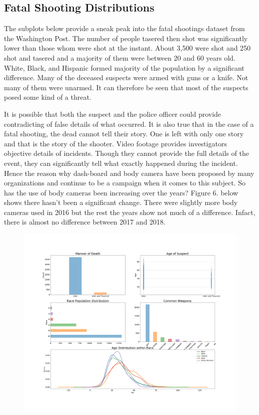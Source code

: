 \documentclass[a4paper,12pt]{article}
\begin{document}
\subsection{Fatal Shooting Distributions}
The subplots below provide a sneak peak into the fatal shootings dataset from the Washington Post. The number of people tasered then shot was significantly lower than those whom were shot at the instant. About 3,500 were shot and 250 shot and tasered and a majority of them were between 20 and 60 years old. White, Black, and Hispanic formed majority of the population by a significant difference. Many of the deceased suspects were armed with guns or a knife. Not many of them were unarmed. It can therefore be seen that most of the suspects posed some kind of a threat. 

It is possible that both the suspect and the police officer could provide contradicting of false details of what occurred. It is also true that in the case of a fatal shooting, the dead cannot tell their story. One is left with only one story and that is the story of the shooter. Video footage provides investigators objective details of incidents\cite{camera}. Though they cannot provide the full details of the event, they can significantly tell what exactly happened during the incident. Hence the reason why dash-board and body camera have been proposed by many organizations and continue to be a campaign when it comes to this subject. So has the use of body cameras been increasing over the years? Figure 6. below shows there hasn't been a significant change. There were slightly more body cameras used in 2016 but the rest the years show not much of a difference. Infact, there is almost no difference between 2017 and 2018.
\begin{figure}[hbt!]
    \centering
    \includegraphics[width=1.0\textwidth]{distribution_plots.png}
    \caption{}
\end{figure}
\FloatBarrier
\end{document}
